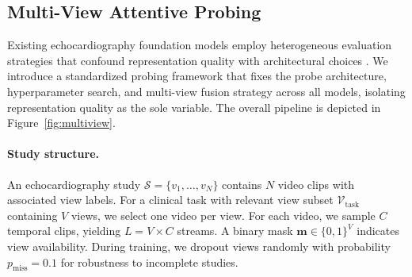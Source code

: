 \documentclass{article}
\newcommand{\study}{\mathcal{S}}
\newcommand{\viewset}{\mathcal{V}}
\theoremstyle{plain}
\theoremstyle{definition}
\theoremstyle{remark}
\begin{document}



\subsection{Multi-View Attentive Probing}
\label{sec:method:probing}

Existing echocardiography foundation models employ heterogeneous evaluation strategies that confound representation quality with architectural choices \citep{panecho, echoprime}. We introduce a standardized probing framework that fixes the probe architecture, hyperparameter search, and multi-view fusion strategy across all models, isolating representation quality as the sole variable. The overall pipeline is depicted in Figure~\ref{fig:multiview}.

\paragraph{Study structure.}
An echocardiography study $\study = \{v_1, \ldots, v_N\}$ contains $N$ video clips with associated view labels. For a clinical task with relevant view subset $\viewset_{\text{task}}$ containing $V$ views, we select one video per view. For each video, we sample $C$ temporal clips, yielding $L = V \times C$ streams. A binary mask $\mathbf{m} \in \{0,1\}^V$ indicates view availability. During training, we dropout views randomly with probability $p_{\text{miss}} = 0.1$ for robustness to incomplete studies.
\end{document}
